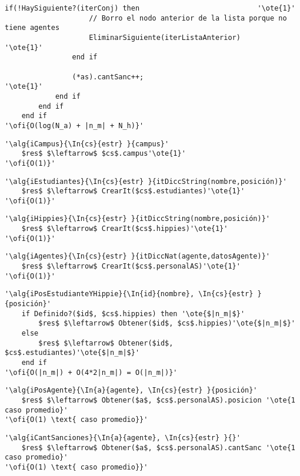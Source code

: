 \begin{lstlisting}[mathescape]
	   			if(!HaySiguiente?(iterConj) then							'\ote{1}'
	   				// Borro el nodo anterior de la lista porque no tiene agentes
	   				EliminarSiguiente(iterListaAnterior)					'\ote{1}'
	   			end if
	   			
	   			(*as).cantSanc++;											'\ote{1}'
	   		end if
	   	end if
	end if
'\ofi{O(log(N_a) + |n_m| + N_h)}'
\end{lstlisting}

\begin{lstlisting}[mathescape]
'\alg{iCampus}{\In{cs}{estr} }{campus}'
	$res$ $\leftarrow$ $cs$.campus'\ote{1}'
'\ofi{O(1)}'
\end{lstlisting}

\begin{lstlisting}[mathescape]
'\alg{iEstudiantes}{\In{cs}{estr} }{itDiccString(nombre,posición)}'
	$res$ $\leftarrow$ CrearIt($cs$.estudiantes)'\ote{1}'
'\ofi{O(1)}'
\end{lstlisting}

\begin{lstlisting}[mathescape]
'\alg{iHippies}{\In{cs}{estr} }{itDiccString(nombre,posición)}'
	$res$ $\leftarrow$ CrearIt($cs$.hippies)'\ote{1}'
'\ofi{O(1)}'
\end{lstlisting}

\begin{lstlisting}[mathescape]
'\alg{iAgentes}{\In{cs}{estr} }{itDiccNat(agente,datosAgente)}'
	$res$ $\leftarrow$ CrearIt($cs$.personalAS)'\ote{1}'
'\ofi{O(1)}'
\end{lstlisting}

\begin{lstlisting}[mathescape]
'\alg{iPosEstudianteYHippie}{\In{id}{nombre}, \In{cs}{estr} }{posición}'
	if Definido?($id$, $cs$.hippies) then '\ote{$|n_m|$}'
		$res$ $\leftarrow$ Obtener($id$, $cs$.hippies)'\ote{$|n_m|$}'
	else
		$res$ $\leftarrow$ Obtener($id$, $cs$.estudiantes)'\ote{$|n_m|$}'
	end if
'\ofi{O(|n_m|) + O(4*2|n_m|) = O(|n_m|)}'
\end{lstlisting}

\begin{lstlisting}[mathescape]
'\alg{iPosAgente}{\In{a}{agente}, \In{cs}{estr} }{posición}'
	$res$ $\leftarrow$ Obtener($a$, $cs$.personalAS).posicion '\ote{1 caso promedio}'
'\ofi{O(1) \text{ caso promedio}}'
\end{lstlisting}

\begin{lstlisting}[mathescape]
'\alg{iCantSanciones}{\In{a}{agente}, \In{cs}{estr} }{}'
	$res$ $\leftarrow$ Obtener($a$, $cs$.personalAS).cantSanc '\ote{1 caso promedio}'
'\ofi{O(1) \text{ caso promedio}}'
\end{lstlisting}

